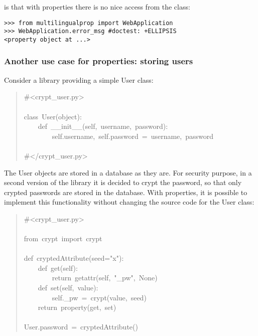 \documentclass[10pt,a4paper,english]{article}
\begin{document}
is that with properties there is no nice access from the class:
\begin{verbatim}>>> from multilingualprop import WebApplication
>>> WebApplication.error_msg #doctest: +ELLIPSIS
<property object at ...>\end{verbatim}



\hypertarget{another-use-case-for-properties-storing-users}{}
\subsubsection*{Another use case for properties: storing users}

Consider a library providing a simple User class:
\begin{quote}{\ttfamily \raggedright \noindent
{\#}<crypt{\_}user.py>~\\
~\\
class~User(object):~\\
~~~~def~{\_}{\_}init{\_}{\_}(self,~username,~password):~\\
~~~~~~~~self.username,~self.password~=~username,~password~\\
~\\
{\#}</crypt{\_}user.py>
}\end{quote}

The User objects are stored in a database as they are.
For security purpose, in a second version of the library it is
decided to crypt the password, so that only crypted passwords
are stored in the database. With properties, it is possible to
implement this functionality without changing the source code for 
the User class:
\begin{quote}{\ttfamily \raggedright \noindent
{\#}<crypt{\_}user.py>~\\
~\\
from~crypt~import~crypt~\\
~\\
def~cryptedAttribute(seed="x"):~\\
~~~~def~get(self):~\\
~~~~~~~~return~getattr(self,~"{\_}pw",~None)~\\
~~~~def~set(self,~value):~\\
~~~~~~~~self.{\_}pw~=~crypt(value,~seed)~\\
~~~~return~property(get,~set)~\\
~~~~\\
User.password~=~cryptedAttribute()
}\end{quote}
\end{document}
